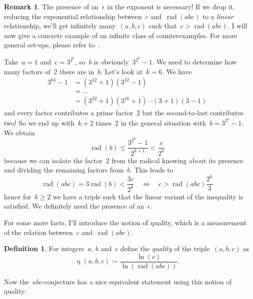 \documentclass[11pt, a4paper, openany, oneside, article]{memoir}
\theoremstyle{definition}
\newtheorem{definition}[theorem]{Definition}
\newtheorem{remark}[theorem]{Remark}
\DeclareMathOperator\rad{rad}
\DeclareMathOperator\quality{q}
\begin{document}
\begin{remark}
  The presence of an~$\epsilon$ in the exponent is necessary! If we drop it, reducing the exponential relationship between~$c$ and~$\rad(abc)$ to a \emph{linear} relationship, we'll get infinitely many~$(a,b,c)$ such that~$c>\rad(abc)$. I will now give a concrete example of an infinite class of counterexamples. For more general set-ups, please refer to~\cite{lower-bounds-abc-hits}.
  
  Take~$a=1$ and~$c=3^{2^k}$, so~$b$ is obviously~$3^{2^k}-1$. We need to determine how many factors of~$2$ there are in~$b$. Let's look at~$k=6$. We have
  \begin{equation}
    \begin{aligned}
      3^{64}-1&=(3^{32}+1)(3^{32}-1) \\
      &=\ldots \\
      &=(3^{32}+1)(3^{16}+1)\cdots(3+1)(3-1)
    \end{aligned}
  \end{equation}
  and every factor contributes a prime factor~$2$ but the second-to-last contributes two! So we end up with~$k+2$ times~$2$ in the general situation with~$b=3^{2^k}-1$. We obtain
  \begin{equation}
    \rad(b)\leq\frac{3^{2^k}-1}{2^{k+1}}<\frac{c}{2^{k}}
  \end{equation}
  because we can isolate the factor~$2$ from the radical knowing about its presence and dividing the remaining factors from~$b$. This leads to
  \begin{equation}
    \rad(abc)=3\rad(b)<\frac{3c}{2^k}\quad\Leftrightarrow\quad c>\rad(abc)\frac{2^k}{3}
  \end{equation}
  hence for~$k\geq 2$ we have a triple such that the linear variant of the inequality is satisfied. We definitely need the presence of an~$\epsilon$.
\end{remark}

For some more facts, I'll introduce the notion of quality, which is a measurement of the relation between~$c$ and~$\rad(abc)$.

\begin{definition}
  For integers~$a$, $b$ and~$c$ define the \emph{quality} of the triple~$(a,b,c)$ as
  \begin{equation}
    \quality(a,b,c)\coloneqq\frac{\ln(c)}{\ln\left( \rad(abc) \right)}.
  \end{equation}
\end{definition}

Now the~$abc$\nobreakdash-conjecture has a nice equivalent statement using this notion of quality:
\end{document}

